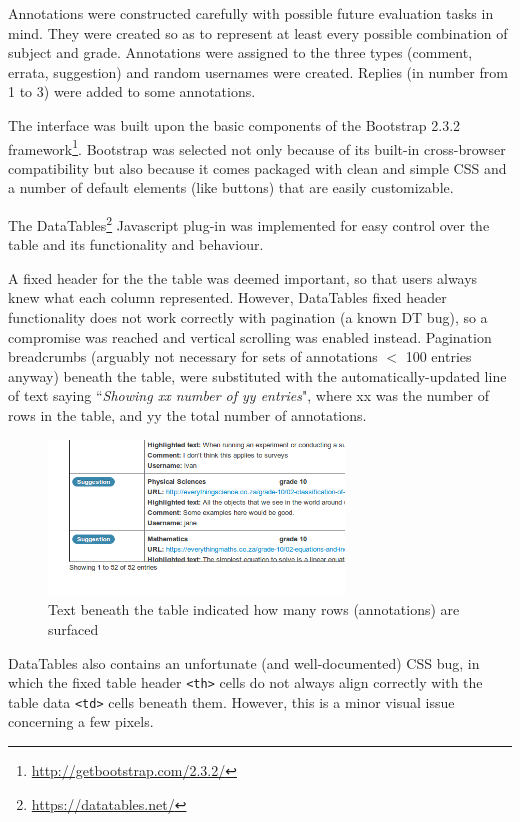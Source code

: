 Annotations were constructed carefully with possible future evaluation tasks in mind. They were created so as to represent at least every possible combination of subject and grade. Annotations were assigned to the three types (comment, errata, suggestion) and random usernames were created. Replies (in number from 1 to 3) were added to some annotations.

The interface was built upon the basic components of the Bootstrap 2.3.2 framework\footnote{\href{http://getbootstrap.com/2.3.2/}{http://getbootstrap.com/2.3.2/}}. Bootstrap was selected not only because of its built-in cross-browser compatibility but also because it comes packaged with clean and simple CSS and a number of default elements (like buttons) that are easily customizable. 

The DataTables\footnote{\href{https://datatables.net/}{https://datatables.net/}} Javascript plug-in was implemented for easy control over the table and its functionality and behaviour. 

A fixed header for the the table was deemed important, so that users always knew what each column represented. However, DataTables fixed header functionality does not work correctly with pagination (a known DT bug), so a compromise was reached and vertical scrolling was enabled instead. Pagination breadcrumbs (arguably not necessary for sets of annotations $<$ 100 entries anyway) beneath the table, were substituted with the automatically-updated line of text saying ``\textit{Showing xx number of yy entries}", where xx was the number of rows in the table, and yy the total number of annotations.

\begin{figure}[h!]
    \centering
    \includegraphics[width=0.7\textwidth]{Figures/V1/breadcrumbs.png}
 \caption{Text beneath the table indicated how many rows (annotations) are surfaced}
 \label{fig:breadcrumbs}
\end{figure}

DataTables also contains an unfortunate (and well-documented) CSS bug, in which the fixed table header \verb|<th>|                                                                                                                cells do not always align correctly with the table data \verb|<td>| cells beneath them. However, this is a minor visual issue concerning a few pixels.

